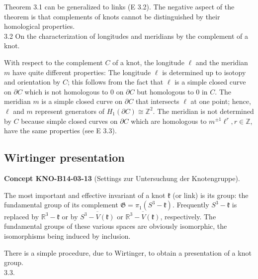 \documentclass[10pt, letterpaper]{article}
\newcommand{\CustomHeading}[3]{%
  \par\medskip\noindent%
  \textbf{#1 #2} \textnormal{(#3)}.\enskip%
}
\newenvironment{CONC}[2]{\begin{unitbox}\CustomHeading{Concept}{#1}{#2}}{\end{unitbox}}
\begin{document}
Theorem 3.1 can be generalized to links (E 3.2). The negative aspect of the theorem is that complements of knots cannot be distinguished by their homological properties.\\



3.2 On the characterization of longitudes and meridians by the complement of a knot. 

With respect to the complement $C$ of a knot, the longitude $\ell$ and the meridian $m$ have quite different properties: The longitude $\ell$ is determined up to isotopy and orientation by $C$; this follows from the fact that $\ell$ is a simple closed curve on $\partial C$ which is not homologous to 0 on $\partial C$ but homologous to 0 in $C$. The meridian $m$ is a simple closed curve on $\partial C$ that intersects $\ell$ at one point; hence, $\ell$ and $m$ represent generators of $H_{1}(\partial C) \cong \mathbb{Z}^{2}$. The meridian is not determined by $C$ because simple closed curves on $\partial C$ which are homologous to $m^{ \pm 1} \ell^{r}, r \in \mathbb{Z}$, have the same properties (see E 3.3).



\pagebreak

\subsection{Wirtinger presentation}

\begin{CONC}{KNO-B14-03-13}{Settings zur Untersuchung der Knotengruppe}
The most important and effective invariant of a knot $\mathfrak{k}$ (or link) is its group: the fundamental group of its complement $\mathfrak{G}=\pi_{1}\left(S^{3}-\mathfrak{k}\right)$. Frequently $S^{3}-\mathfrak{k}$ is replaced by $\mathbb{R}^{3}-\mathfrak{k}$ or by $\overline{S^{3}-V(\mathfrak{k})}$ or $\overline{\mathbb{R}^{3}-V(\mathfrak{k})}$, respectively. The fundamental groups of these various spaces are obviously isomorphic, the isomorphisms being induced by inclusion.
\end{CONC}

There is a simple procedure, due to Wirtinger, to obtain a presentation of a knot group.\\

3.3. 
\end{document}
